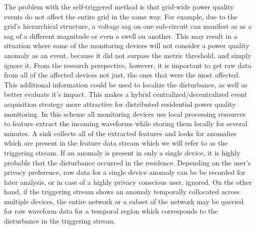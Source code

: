The problem with the self-triggered method is that grid-wide power quality events do not affect the entire grid in the same way.
For example, due to the grid's hierarchical structure, a voltage sag on one sub-circuit can manifest as as a sag of a different magnitude or even a swell on another.\cite{kahle2016power}
This may result in a situation where some of the monitoring devices will not consider a power quality anomaly as an event, because it did not surpass the metric threshold, and simply ignore it.
From the research perspective, however, it is important to get raw data from all of the affected devices not just, the ones that were the most affected.
This additional information could be used to localize the disturbance, as well as better evaluate it's impact.
This makes a hybrid centralized/decentralized event acquisition strategy more attractive for distributed residential power quality monitoring.
In this scheme all monitoring devices use local processing resources to feature extract the incoming waveforms while storing them locally for several minutes.
A sink collects all of the extracted features and looks for anomalies which are present in the feature data stream which we will refer to as the triggering stream.
If an anomaly is present in only a single device, it is highly probable that the disturbance occurred in the residence.
Depending on the user's privacy preference, raw data for a single device anomaly can be be recorded for later analysis, or in case of a highly privacy conscious user, ignored.
On the other hand, if the triggering stream shows an anomaly temporally collocated across multiple devices, the entire network or a subset of the network may be queried for raw waveform data for a temporal region which corresponds to the disturbance in the triggering stream.

